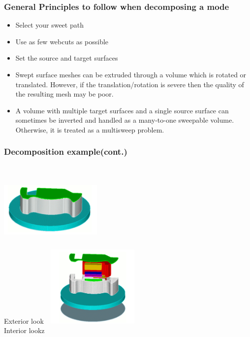 \documentclass[fleqn]{beamer}
\begin{document}
\begin{frame}
\frametitle{General Principles to follow when decomposing a mode}
 \begin{itemize}
  \item Select your sweet path
  \item Use as few webcuts as possible
  \item Set the source and target surfaces
  \item Swept surface meshes can be extruded through a volume which is rotated or translated.
However, if the translation/rotation is severe then the quality of the resulting mesh may be
poor.
\item A volume with multiple target surfaces and a single source surface can sometimes be inverted
and handled as a many-to-one sweepable volume. Otherwise, it is treated as a multisweep
problem.
\end{itemize}
\end{frame}


  \begin{frame}
 \frametitle{Decomposition example(cont.)}
 \begin{columns}[t]
 \centering
 \includegraphics[width=5cm,height=4cm]{figures/decomp_exterior.png}\\{Exterior look}
 \centering
 \includegraphics[width=5cm,height=4cm]{figures/decomp_interior.png}\\{Interior lookz}
 \end{columns}
 \end{frame}
 
\end{document}
